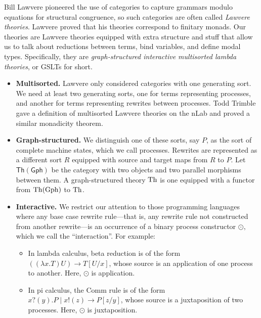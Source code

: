 \documentclass{article}
\begin{document}
Bill Lawvere pioneered the use of categories to capture grammars modulo equations for structural congruence, so such categories are often called \emph{Lawvere theories}. Lawvere proved that his theories correspond to finitary monads. Our theories are Lawvere theories equipped with extra structure and stuff that allow us to talk about reductions between terms, bind variables, and define modal types.  Specifically, they are \emph{graph-structured interactive multisorted lambda theories}, or GSLTs for short.

\begin{itemize}
    \item {\bf Multisorted.}  Lawvere only considered categories with one generating sort. We need at least two generating sorts, one for terms representing processes, and another for terms representing rewrites between processes. Todd Trimble gave a definition of multisorted Lawvere theories on the nLab
and proved a similar monadicity theorem.

    \item {\bf Graph-structured.}  We distinguish one of these sorts, say $P$, as the sort of complete machine states, which we call processes. Rewrites are represented as a different sort $R$ equipped with source and target maps from $R$ to $P$. Let $\mathsf{Th(Gph)}$ be the category with two objects and two parallel morphisms between them. A graph-structured theory ${\rm Th}$ is one equipped with a functor from ${\rm Th}({\rm Gph})$ to ${\rm Th}$.

    \item {\bf Interactive.}  We restrict our attention to those programming languages where any base case rewrite rule---that is, any rewrite rule not constructed from another rewrite---is an occurrence of a binary process constructor $\odot,$ which we call the ``interaction''.  For example:

\begin{itemize}
    \item In lambda calculus, beta reduction is of the form $((\lambda x.T) U) \to T[U/x]$, whose source is an application of one process to another.  Here, $\odot$ is application.
    \item In pi calculus, the Comm rule is of the form $x?(y).P \mid x!(z) \to P[z/y]$, whose source is a juxtaposition of two processes.  Here, $\odot$ is juxtaposition.
\end{itemize}


\end{itemize}
\end{document}
